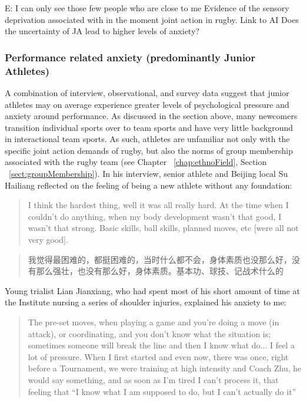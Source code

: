 \begin{CJK}{UTF8}{gbsn}
E: I can only see those few people who are close to me
Evidence of the sensory deprivation associated with in the moment joint action in rugby. Link to AI
Does the uncertainty of JA lead to higher levels of anxiety?   


\subsubsection{Performance related anxiety (predominantly Junior Athletes)}

A combination of interview, observational, and survey data suggest that junior athletes may on average experience greater levels of psychological pressure and anxiety around performance.  As discussed in the section above, many newcomers transition individual sports over to team sports and have very little background in interactional team sports. As such, athletes are unfamiliar not only with the specific joint action demands of rugby, but also the norms of group membership associated with the rugby team (see Chapter ~\ref{chap:ethnoField}, Section ~\ref{sect:groupMembership}).  In his interview, senior athlete and Beijing local Su Hailiang reflected on the feeling of being a new athlete without any foundation:

\begin{quote}
    I think the hardest thing, well it was all really hard.  At the time when I couldn't do anything, when my body development wasn't that good, I wasn't that strong.  Basic skills, ball skills, planned moves, etc [were all not very good].
\end{quote}

\begin{quote}
    我觉得最困难的，都挺困难的，当时什么都不会，身体素质也没那么好，没有那么强壮，也没有那么好，身体素质。基本功、球技、记战术什么的 
\end{quote}

Young trialist Lian Jianxiang, who had spent most of his short amount of time at the Institute nursing a series of shoulder injuries, explained his anxiety to me:

    \begin{quote}
      The pre-set moves, when playing a game and you’re doing a move (in attack), or coordinating, and you don’t know what the situation is; sometimes someone will break the line and then I know what do... I feel a lot of pressure.  When I first started and even now, there was once, right before a Tournament, we were training at high intensity and Coach Zhu, he would say something, and as soon as I'm tired I can't process it, that feeling that ``I know what I am supposed to do, but I can't actually do it''
    \end{quote}


\end{CJK}
